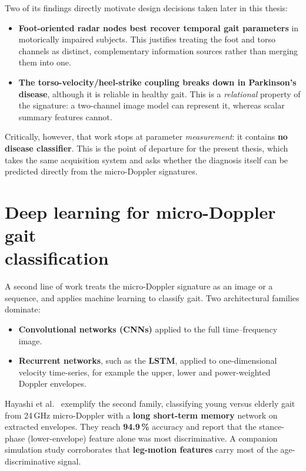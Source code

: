 Two of its findings directly motivate design decisions taken later in this
thesis:

\begin{itemize}
  \item \textbf{Foot-oriented radar nodes best recover temporal gait parameters}
        in motorically impaired subjects. This justifies treating the foot and
        torso channels as distinct, complementary information sources rather than
        merging them into one.
  \item \textbf{The torso-velocity/heel-strike coupling breaks down in
        Parkinson's disease}, although it is reliable in healthy gait. This is a
        \emph{relational} property of the signature: a two-channel image
        model can represent it, whereas scalar summary features cannot.
\end{itemize}

Critically, however, that work stops at parameter \emph{measurement}: it contains
\textbf{no disease classifier}. This is the point of departure for the present
thesis, which takes the same acquisition system and asks whether the diagnosis
itself can be predicted directly from the micro-Doppler signatures.

\section[Deep learning for micro-Doppler gait classification]{Deep learning for micro-Doppler gait\\ classification}
\label{sec:dl}

A second line of work treats the micro-Doppler signature as an image or a
sequence, and applies machine learning to classify gait. Two architectural
families dominate:

\begin{itemize}
  \item \textbf{Convolutional networks (CNNs)} applied to the full
        time--frequency image.
  \item \textbf{Recurrent networks}, such as the \textbf{LSTM}, applied to
        one-dimensional velocity time-series, for example the upper, lower
        and power-weighted Doppler envelopes.
\end{itemize}

Hayashi et al.\ \cite{hayashi2021} exemplify the second family, classifying
young versus elderly gait from 24\,GHz micro-Doppler with a
\textbf{long short-term memory} network on extracted envelopes. They reach
\textbf{94.9\,\%} accuracy and report that the stance-phase (lower-envelope)
feature alone was most discriminative. A companion simulation study
\cite{hoshiga2021} corroborates that \textbf{leg-motion features} carry most of
the age-discriminative signal.

